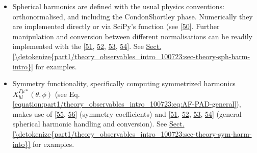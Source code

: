\documentclass[letterpaper,table,10pt,english]{jupyterBook}
\begin{document}
\begin{itemize}
\begin{itemize}
\item {} 
\sphinxAtStartPar
Spherical harmonics are defined with the usual physics conventions: orthonormalised, and including the Condon\sphinxhyphen{}Shortley phase. Numerically they are implemented directly or via SciPy’s  function (see  {[}\hyperlink{cite.backmatter/bibliography:id857}{50}{]}. Further manipulation and conversion between different normalisations can be readily implemented with the  {[}\hyperlink{cite.backmatter/bibliography:id868}{51}, \hyperlink{cite.backmatter/bibliography:id936}{52}, \hyperlink{cite.backmatter/bibliography:id937}{53}, \hyperlink{cite.backmatter/bibliography:id938}{54}{]}. See \hyperref[\detokenize{part1/theory_observables_intro_100723:sec-theory-sph-harm-intro}]{Sect.\@ \ref{\detokenize{part1/theory_observables_intro_100723:sec-theory-sph-harm-intro}}} for examples.

\item {} 
\sphinxAtStartPar
Symmetry functionality, specifically computing symmetrized harmonics \(X_{hl}^{\Gamma\mu*}(\theta,\phi)\) (see Eq. \eqref{equation:part1/theory_observables_intro_100723:eq:AF-PAD-general}), makes use of  {[}\hyperlink{cite.backmatter/bibliography:id691}{55}, \hyperlink{cite.backmatter/bibliography:id692}{56}{]} (symmetry coefficients) and  {[}\hyperlink{cite.backmatter/bibliography:id868}{51}, \hyperlink{cite.backmatter/bibliography:id936}{52}, \hyperlink{cite.backmatter/bibliography:id937}{53}, \hyperlink{cite.backmatter/bibliography:id938}{54}{]} (general spherical harmonic handling and conversion).  See \hyperref[\detokenize{part1/theory_observables_intro_100723:sec-theory-sym-harm-into}]{Sect.\@ \ref{\detokenize{part1/theory_observables_intro_100723:sec-theory-sym-harm-into}}} for examples.

\end{itemize}


\end{itemize}
\end{document}
